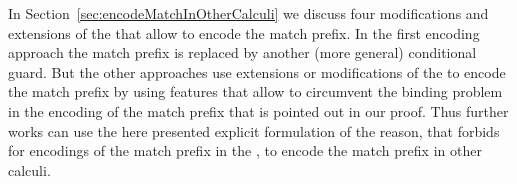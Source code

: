 \documentclass[final,copyright,creativecommons]{eptcs}
\begin{document}
In Section~\ref{sec:encodeMatchInOtherCalculi} we discuss four modifications and extensions of the \piCal that allow to encode the match prefix. 
In the first encoding approach the match prefix is replaced by another (more general) conditional guard. But the other approaches use extensions or modifications of the \piCal to encode the match prefix by using features that allow to circumvent the binding problem in the encoding of the match prefix that is pointed out in our proof.
Thus further works can use the here presented explicit formulation of the reason, that forbids for encodings of the match prefix in the \piCal, to encode the match prefix in other calculi.



\end{document}
